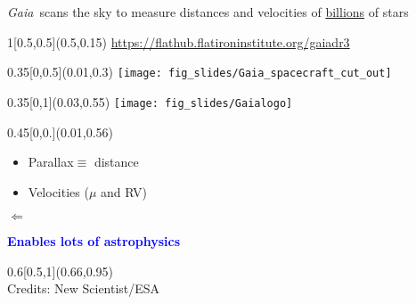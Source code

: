 \documentclass[xcolor=dvipsnames,professionalfonts, aspectratio=169]{beamer}
\begin{document}
\begin{frame}{\emph{Gaia}~scans the sky to measure distances and
    velocities of \underline{billions} of stars}


  \begin{textblock}{1}[0.5,0.5](0.5,0.15)
    \centering\small
    \url{https://flathub.flatironinstitute.org/gaiadr3}
  \end{textblock}


  \begin{textblock}{0.35}[0,0.5](0.01,0.3)
    \texttt{[image: fig\_slides/Gaia\_spacecraft\_cut\_out]}
  \end{textblock}
  \begin{textblock}{0.35}[0,1](0.03,0.55)
    \texttt{[image: fig\_slides/Gaialogo]}
  \end{textblock}

  \begin{textblock}{0.45}[0,0.](0.01,0.56)
    \begin{itemize}\color{black}
    \item Parallax$\equiv$ distance
    \item Velocities ($\mu$ and RV)
    \end{itemize}
    \vspace*{-10pt}
    \hspace*{70pt}\begin{sideways}
      $\Leftarrow$
    \end{sideways}

    \textbf{\textcolor{Blue}{Enables lots of astrophysics}}
  \end{textblock}

  \begin{textblock}{0.6}[0.5,1](0.66,0.95)
    \centering
    \\
    \textcolor{gray!50}{\tiny Credits: New Scientist/ESA}
  \end{textblock}
\end{frame}
\end{document}
